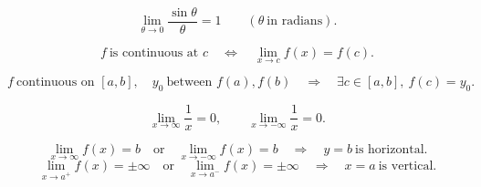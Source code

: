 \[
  \lim_{\theta\to0}\frac{\sin\theta}{\theta}=1
  \qquad(\theta\ \text{in radians}).
\]

\[
  f\ \text{is continuous at }c
  \quad\Longleftrightarrow\quad
  \lim_{x\to c}f(x)=f(c).
\]

\[
  f\ \text{continuous on }[a,b],
  \quad
  y_0\ \text{between }f(a),f(b)
  \quad\Longrightarrow\quad
  \exists c\in[a,b],\ f(c)=y_0.
\]

\[
  \lim_{x\to\infty}\frac1x=0,
  \qquad
  \lim_{x\to-\infty}\frac1x=0.
\]

\[
  \lim_{x\to\infty}f(x)=b
  \quad\text{or}\quad
  \lim_{x\to-\infty}f(x)=b
  \quad\Longrightarrow\quad
  y=b\ \text{is horizontal}.
\]
\[
  \lim_{x\to a^+}f(x)=\pm\infty
  \quad\text{or}\quad
  \lim_{x\to a^-}f(x)=\pm\infty
  \quad\Longrightarrow\quad
  x=a\ \text{is vertical}.
\]

